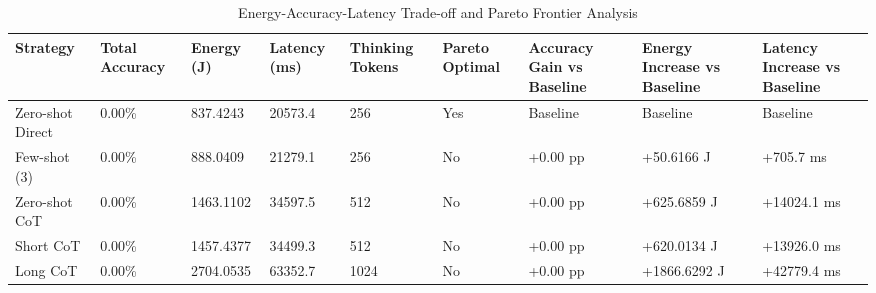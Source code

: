 \begin{table}
\caption{Energy-Accuracy-Latency Trade-off and Pareto Frontier Analysis}
\label{tab:tradeoff_comparison}
\begin{tabular}{lllllllll}
\toprule
Strategy & Total Accuracy & Energy (J) & Latency (ms) & Thinking Tokens & Pareto Optimal & Accuracy Gain vs Baseline & Energy Increase vs Baseline & Latency Increase vs Baseline \\
\midrule
Zero-shot Direct & 0.00\% & 837.4243 & 20573.4 & 256 & Yes & Baseline & Baseline & Baseline \\
Few-shot (3) & 0.00\% & 888.0409 & 21279.1 & 256 & No & +0.00 pp & +50.6166 J & +705.7 ms \\
Zero-shot CoT & 0.00\% & 1463.1102 & 34597.5 & 512 & No & +0.00 pp & +625.6859 J & +14024.1 ms \\
Short CoT & 0.00\% & 1457.4377 & 34499.3 & 512 & No & +0.00 pp & +620.0134 J & +13926.0 ms \\
Long CoT & 0.00\% & 2704.0535 & 63352.7 & 1024 & No & +0.00 pp & +1866.6292 J & +42779.4 ms \\
\bottomrule
\end{tabular}
\end{table}
